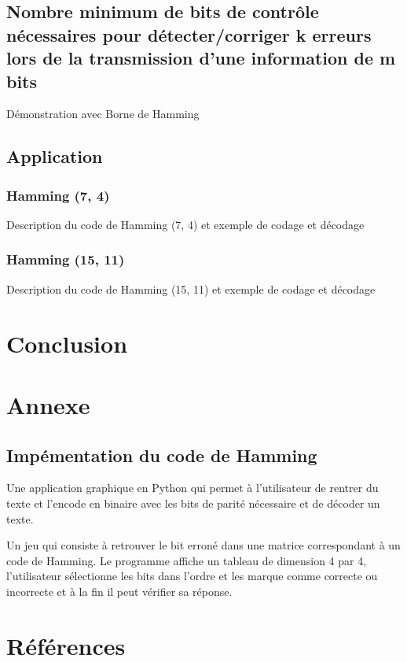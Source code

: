 \documentclass[a4paper, 12pt]{article}
\begin{document}
		\subsection{Nombre minimum de bits de contrôle nécessaires pour détecter/corriger k erreurs lors de la transmission d’une information de m bits}
		Démonstration avec Borne de Hamming
		\color{orange}
		\subsection{Application}
			\subsubsection{Hamming (7, 4)}
			Description du code de Hamming (7, 4) et exemple de codage et décodage
			\subsubsection{Hamming (15, 11)}
			Description du code de Hamming (15, 11) et exemple de codage et décodage
	\color{violet}
	\section*{\vspace{6pt}Conclusion}
	
	\color{black}
	\section*{Annexe}
	\subsection*{Impémentation du code de Hamming}
		Une application graphique en Python qui permet à l'utilisateur de rentrer du texte et l'encode en binaire avec les bits de parité nécessaire et de décoder un texte.

		Un jeu qui consiste à retrouver le bit erroné dans une matrice correspondant à un code de Hamming. Le programme affiche un tableau de dimension 4 par 4, l'utilisateur sélectionne les bits dans l'ordre et les marque comme correcte ou incorrecte et à la fin il peut vérifier sa réponse.

	\section*{Références}
\end{document}

